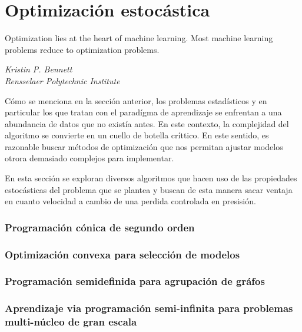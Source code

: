 \documentclass{book}
\theoremstyle{plain}
\theoremstyle{definition}
\theoremstyle{remark}
\begin{document}
\chapter{Optimización estocástica}



\epigraph{Optimization lies at the heart of machine learning. Most machine learning problems reduce
to optimization problems.}{\textit{Kristin P. Bennett \\ Rensselaer Polytechnic Institute}}
\newpage


Cómo se menciona en la sección anterior, los problemas estadísticos y en particular los que tratan con el paradígma de aprendizaje se enfrentan a una abundancia de datos que no existía antes. En este contexto, la complejidad del algoritmo se convierte en un cuello de botella críttico. En este sentido, es razonable buscar métodos de optimización que nos permitan ajustar modelos otrora demasiado complejos para implementar. 

En esta sección se exploran diversos algoritmos que hacen uso de las propiedades estocásticas del problema que se plantea y buscan de esta manera sacar ventaja en cuanto velocidad a cambio de una perdida controlada en presisión. 

\subsection{Programación cónica de segundo orden}
\subsection{Optimización convexa para selección de modelos}
\subsection{Programación semidefinida para agrupación de gráfos}
\subsection{Aprendizaje via programación semi-infinita para problemas multi-núcleo de gran escala}
\end{document}
